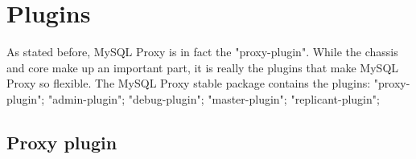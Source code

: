 \begin{comment}
Typically another thread will pick up this request from the queue (although in theory it could end up on the same thread
that issued the wait request) which will then add it to its thread-local event\_base to be notified whenever the file
descriptor is ready.

This process continues until a connection is closed by a client or server or a network error occurs causing the sockets to
be closed. After that no new wait requests will be scheduled.

A single thread can have any number of events added to its thread-local event\_base. It is only when a new blocking I/O
operation is necessary that the events can travel between threads, but not at any other point. Thus it is theoretically
possible that one thread ends up with all the active sockets while the other threads are idling.

However, since waiting for network events happens quite frequently, active connections should spread among the threads
fairly quickly, easing the pressure on the thread having the most active connections to process.

Note that, even though not depicted below, the main thread currently takes part in processing events after the accept
state. This is not ideal because all accepted connections need to go through a single thread. On the other hand, it has
not shown up as a bottleneck yet.

In more detail:


\begin{figure}[htbp]
\centering    
\texttt{[image: images/signaling\_thread\_io.png]}
\caption{bla bla bla}
\label{fig:signaling_thread_io}
\end{figure}

\end{comment}


\section{Plugins}

As stated before, MySQL Proxy is in fact the "proxy-plugin".  
While the chassis and core make up an important part, it is really the plugins that make MySQL Proxy so flexible.
The MySQL Proxy stable package contains the plugins: "proxy-plugin"; "admin-plugin"; "debug-plugin"; "master-plugin"; "replicant-plugin";
 

\subsection{Proxy plugin}

